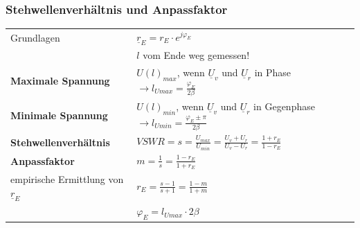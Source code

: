 \subsubsection{Stehwellenverhältnis und Anpassfaktor}
  \renewcommand{\arraystretch}{1.3}
   \begin{tabular}{|l|l|}
   	 \hline
   		Grundlagen 
   		& $\underline{r}_E = r_E \cdot e^{j\varphi_E}$\\
   		& $l$ vom Ende weg gemessen!\\
   	  \hline
   		\textbf{Maximale Spannung}
   		& $U(l)_{max}$, wenn $\underline{U}_v$ und $\underline{U}_r$ in Phase $ \rightarrow l_{Umax} = \frac{\varphi_E}{2\beta} $\\
		\textbf{Minimale Spannung}
   		& $U(l)_{min}$, wenn $\underline{U}_v$ und $\underline{U}_r$ in Gegenphase $ \rightarrow l_{Umin} = \frac{\varphi_E \pm \pi}{2\beta} $\\   		
   	 \hline
   		\textbf{Stehwellenverhältnis} 
        & $VSWR = s = \frac{U_{max}}{U_{min}} = \frac{U_v + U_r}{U_v - U_r} = \frac{1 + r_E}{1-r_E}$\\
     \hline
     	\textbf{Anpassfaktor}
     	& $m = \frac{1}{s} = \frac{1 - r_E}{1+r_E}$\\
     \hline
     	empirische Ermittlung von $\underline{r}_E$ 
     	& $r_E = \frac{s - 1}{s+1} = \frac{1 - m}{1+m}$\\
     	& $\varphi_E = l_{Umax} \cdot 2 \beta$\\
     \hline
   \end{tabular}
  \renewcommand{\arraystretch}{1}
  
